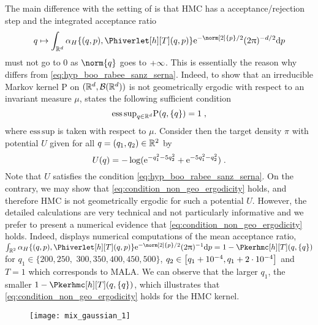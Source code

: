 The main difference with the
setting of \cite{bou:sanz:2017} is that HMC has a acceptance/rejection
step and the integrated acceptance ratio
\[ q \mapsto \int_{\rset^d} \alphaacc\defEnsLigne{(\q,\p),\Phiverlet[h][T](\q,\p)}
\rme^{-\norm[2]{p}/2} (2 \uppi)^{-d/2} \rmd p
\]
must not go to $0$ as
$\norm{q}$ goes to $+\infty$. This is essentially the reason why
 differs from \eqref{eq:hyp_boo_rabee_sanz_serna}. Indeed, to show that an
irreducible Markov kernel $\mathrm{P}$ on $(\mathbb{R}^d, \mathcal{B}(\mathbb{R}^d))$ is not geometrically
ergodic with respect to an invariant measure $\mu$, \cite[Theorem
5.1]{roberts:tweedie:1996:biometrika} states the following sufficient condition
\begin{equation}
  \label{eq:condition_non_geo_ergodicity}
 \mathrm{ess \, sup}_{q \in \mathbb{R}^d} \mathrm{P}(q, \{q\}) = 1 \;,
\end{equation}
 where
$\mathrm{ess\, sup}$ is taken with respect to $\mu$. Consider then
the target density $\pi$ with potential $U$ given for all $q =(q_1,q_2) \in \mathbb{R}^2$ by
\begin{equation}
\label{eq:def_U_mixture_gaussian}
  U(q) = -\log(\mathrm{e}^{-q_1^2 - 5 q_2^2} + \mathrm{e}^{-5q_1^2 - q_2^2}) \;.
\end{equation}
Note that $U$ satisfies the condition
\eqref{eq:hyp_boo_rabee_sanz_serna}. On the contrary, we may show that
\eqref{eq:condition_non_geo_ergodicity} holds, and therefore HMC is
not geometrically ergodic for such a potential $U$.  However, the
detailed calculations are very technical and not particularly
informative and we prefer to present a numerical evidence that
\eqref{eq:condition_non_geo_ergodicity} holds. Indeed,
 displays numerical computations of the mean acceptance ratio,
$\int_{\rset^2} \alphaacc\defEnsLigne{(\q,\p),\Phiverlet[h][T](\q,\p)}
\rme^{-\norm[2]{p}/2} (2 \uppi)^{-1} \rmd p= 1 -\Pkerhmc[h][T](q,\{q\})$ for $q_1 \in \{200,250,$
$300,350,400,450,500\}$,
$q_2 \in \left[q_1+10^{-4},q_1+2\cdot 10^{-4}\right]$ and $T=1$  which
corresponds to MALA. We can observe that the larger $q_1$, the smaller $1-\Pkerhmc[h][T](q,\{q\})$, which illustrates that  \eqref{eq:condition_non_geo_ergodicity}  holds for the HMC
kernel.

 \begin{figure}[h]
   \centering
   \texttt{[image: mix\_gaussian\_1]}
   \caption{}
   \label{fig:accept_mix_gaussian}
 \end{figure}


